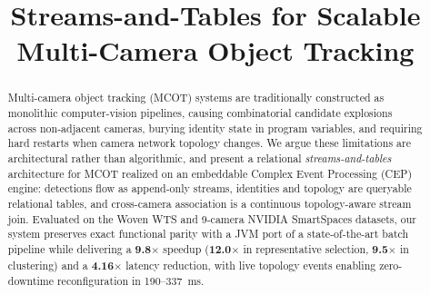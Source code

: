 \documentclass[conference]{IEEEtran}
\begin{document}
\title{Streams-and-Tables for Scalable Multi-Camera Object Tracking}

\author{
}


\maketitle

\begin{abstract}
Multi-camera object tracking (MCOT) systems are traditionally constructed as monolithic computer-vision pipelines, causing combinatorial candidate explosions across non-adjacent cameras, burying identity state in program variables, and requiring hard restarts when camera network topology changes. We argue these limitations are architectural rather than algorithmic, and present a relational \emph{streams-and-tables} architecture for MCOT realized on an embeddable Complex Event Processing (CEP) engine: detections flow as append-only streams, identities and topology are queryable relational tables, and cross-camera association is a continuous topology-aware stream join. Evaluated on the Woven WTS and 9-camera NVIDIA SmartSpaces datasets, our system preserves exact functional parity with a JVM port of a state-of-the-art batch pipeline while delivering a \textbf{9.8$\times$} speedup (\textbf{12.0$\times$} in representative selection, \textbf{9.5$\times$} in clustering) and a \textbf{4.16$\times$} latency reduction, with live topology events enabling zero-downtime reconfiguration in 190--337~ms.
\end{abstract}
\end{document}

